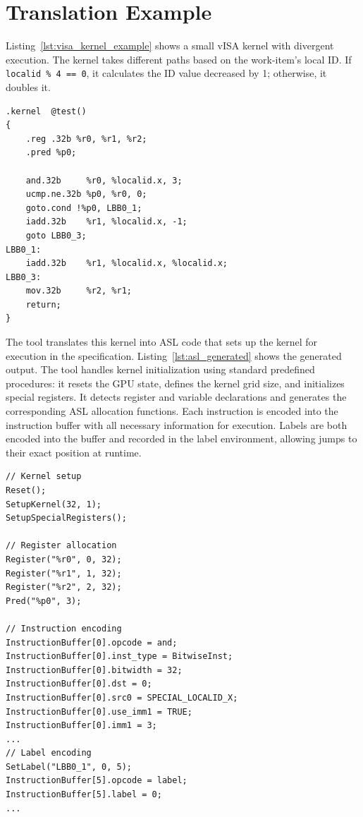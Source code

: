 \section{Translation Example}

Listing~\ref{lst:visa_kernel_example} shows a small vISA kernel with divergent
execution. The kernel takes different paths based on the work-item's local ID.
If \lstinline{localid % 4 == 0}, it calculates the ID value decreased by 1;
otherwise, it doubles it.

\begin{lstlisting}[caption={Example vISA kernel with divergent control flow}, label={lst:visa_kernel_example}]
.kernel  @test()
{
    .reg .32b %r0, %r1, %r2;
    .pred %p0;
    
    and.32b     %r0, %localid.x, 3;
    ucmp.ne.32b %p0, %r0, 0;
    goto.cond !%p0, LBB0_1;
    iadd.32b    %r1, %localid.x, -1;
    goto LBB0_3;
LBB0_1:                                
    iadd.32b    %r1, %localid.x, %localid.x;
LBB0_3:                                 
    mov.32b     %r2, %r1;
    return;
}
\end{lstlisting}

The tool translates this kernel into ASL code that sets up the kernel for
execution in the specification. Listing~\ref{lst:asl_generated} shows the
generated output. The tool handles kernel initialization using standard
predefined procedures: it resets the GPU state, defines the kernel grid size,
and initializes special registers. It detects register and variable
declarations and generates the corresponding ASL allocation functions. Each
instruction is encoded into the instruction buffer with all necessary
information for execution. Labels are both encoded into the buffer and recorded
in the label environment, allowing jumps to their exact position at runtime.

\begin{lstlisting}[caption={Generated ASL code for kernel setup and encoding}, label={lst:asl_generated}]
// Kernel setup
Reset();
SetupKernel(32, 1);
SetupSpecialRegisters();

// Register allocation
Register("%r0", 0, 32);
Register("%r1", 1, 32);
Register("%r2", 2, 32);
Pred("%p0", 3);

// Instruction encoding
InstructionBuffer[0].opcode = and;
InstructionBuffer[0].inst_type = BitwiseInst;
InstructionBuffer[0].bitwidth = 32;
InstructionBuffer[0].dst = 0;
InstructionBuffer[0].src0 = SPECIAL_LOCALID_X;
InstructionBuffer[0].use_imm1 = TRUE;
InstructionBuffer[0].imm1 = 3;
...
// Label encoding
SetLabel("LBB0_1", 0, 5);
InstructionBuffer[5].opcode = label;
InstructionBuffer[5].label = 0;
...
\end{lstlisting}

